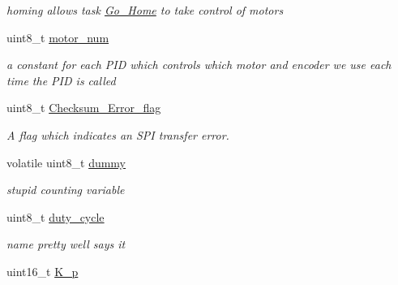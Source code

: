 \begin{DoxyCompactItemize}
\begin{DoxyCompactList}\small\item\em homing allows task \hyperlink{classGo__Home}{Go\-\_\-\-Home} to take control of motors \end{DoxyCompactList}\item 
\hypertarget{classtask__PID_aabeac3edf9b1dc94f9e216ab99d89798}{uint8\-\_\-t \hyperlink{classtask__PID_aabeac3edf9b1dc94f9e216ab99d89798}{motor\-\_\-num}}\label{classtask__PID_aabeac3edf9b1dc94f9e216ab99d89798}

\begin{DoxyCompactList}\small\item\em a constant for each P\-I\-D which controls which motor and encoder we use each time the P\-I\-D is called \end{DoxyCompactList}\item 
\hypertarget{classtask__PID_a3aad6e651da5110ea8d64971272d611b}{uint8\-\_\-t \hyperlink{classtask__PID_a3aad6e651da5110ea8d64971272d611b}{Checksum\-\_\-\-Error\-\_\-flag}}\label{classtask__PID_a3aad6e651da5110ea8d64971272d611b}

\begin{DoxyCompactList}\small\item\em A flag which indicates an S\-P\-I transfer error. \end{DoxyCompactList}\item 
\hypertarget{classtask__PID_a40708de7482ae8000f09de573757b763}{volatile uint8\-\_\-t \hyperlink{classtask__PID_a40708de7482ae8000f09de573757b763}{dummy}}\label{classtask__PID_a40708de7482ae8000f09de573757b763}

\begin{DoxyCompactList}\small\item\em stupid counting variable \end{DoxyCompactList}\item 
\hypertarget{classtask__PID_a0ed9811d402294a2e97513d17603cbde}{uint8\-\_\-t \hyperlink{classtask__PID_a0ed9811d402294a2e97513d17603cbde}{duty\-\_\-cycle}}\label{classtask__PID_a0ed9811d402294a2e97513d17603cbde}

\begin{DoxyCompactList}\small\item\em name pretty well says it \end{DoxyCompactList}\item 
\hypertarget{classtask__PID_a819c45f7b06d30c0c259434e519920df}{uint16\-\_\-t \hyperlink{classtask__PID_a819c45f7b06d30c0c259434e519920df}{K\-\_\-p}}\label{classtask__PID_a819c45f7b06d30c0c259434e519920df}


\end{DoxyCompactItemize}

